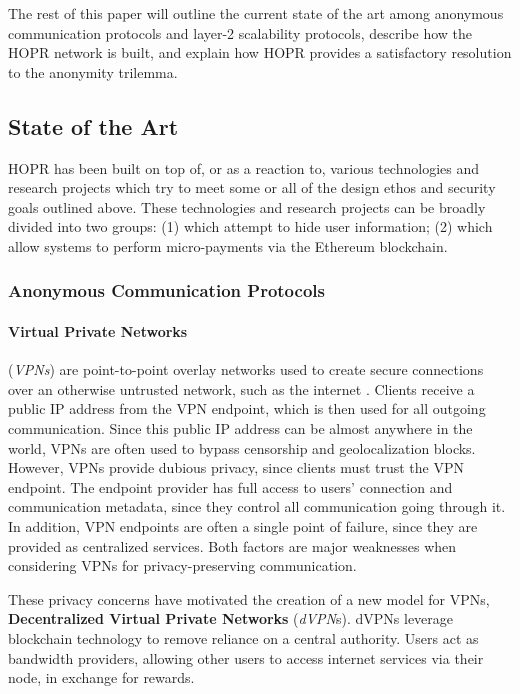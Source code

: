 The rest of this paper will outline the current state of the art among anonymous communication protocols and layer-2 scalability protocols, describe how the HOPR network is built, and explain how HOPR provides a satisfactory resolution to the anonymity trilemma.

\subsection{State of the Art}
\label{sec:stateoftheart}

HOPR has been built on top of, or as a reaction to, various technologies and research projects which try to meet some or all of the design ethos and security goals outlined above. These technologies and research projects can be broadly divided into two groups: (1)  which attempt to hide user information; (2) which allow systems to perform micro-payments via the Ethereum blockchain.

\subsubsection{Anonymous Communication Protocols}
\label{sec:privacyprotocols}

\paragraph{Virtual Private Networks}(\textit{VPNs}) are point-to-point overlay networks used to create secure connections over an otherwise untrusted network, such as the internet \cite{venkateswaran_2001}. Clients receive a public IP address from the VPN endpoint, which is then used for all outgoing communication. Since this public IP address can be almost anywhere in the world, VPNs are often used to bypass censorship \cite{hobbs_roberts_2018} and geolocalization blocks. However, VPNs provide dubious privacy, since clients must trust the VPN endpoint. The endpoint provider has full access to users' connection and communication metadata, since they control all communication going through it. In addition, VPN endpoints are often a single point of failure, since they are provided as centralized services. Both factors are major weaknesses when considering VPNs for privacy-preserving communication.

These privacy concerns have motivated the creation of a new model for VPNs, \textbf{Decentralized Virtual Private Networks} (\textit{dVPN}s). dVPNs leverage blockchain technology to remove reliance on a central authority. Users act as bandwidth providers, allowing other users to access internet services via their node, in exchange for rewards.

